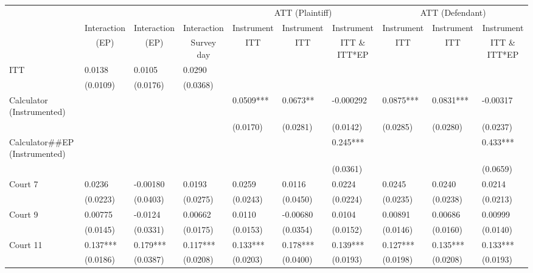 \begin{tabular}{llllllllll}
      & \multicolumn{3}{c}{}  & \multicolumn{3}{c}{ATT (Plaintiff)} & \multicolumn{3}{c}{ATT (Defendant)} \\
\cmidrule{2-10}      & \multicolumn{1}{c}{Interaction} & \multicolumn{1}{c}{Interaction} & \multicolumn{1}{c}{Interaction} & \multicolumn{1}{c}{Instrument} & \multicolumn{1}{c}{Instrument} & \multicolumn{1}{c}{Instrument} & \multicolumn{1}{c}{Instrument} & \multicolumn{1}{c}{Instrument} & \multicolumn{1}{c}{Instrument} \\
\cmidrule{2-10}      & \multicolumn{1}{c}{ (EP)} & \multicolumn{1}{c}{(EP)} & \multicolumn{1}{c}{Survey day} & \multicolumn{1}{c}{ITT} & \multicolumn{1}{c}{ITT} & \multicolumn{1}{c}{ITT \& ITT*EP} & \multicolumn{1}{c}{ITT} & \multicolumn{1}{c}{ITT} & \multicolumn{1}{c}{ITT \& ITT*EP} \\
\midrule
\midrule
ITT   & 0.0138 & 0.0105 & 0.0290 &       &       &       &       &       &  \\
      & (0.0109) & (0.0176) & (0.0368) &       &       &       &       &       &  \\
Calculator (Instrumented) &       &       &       & 0.0509*** & 0.0673** & -0.000292 & 0.0875*** & 0.0831*** & -0.00317 \\
      &       &       &       & (0.0170) & (0.0281) & (0.0142) & (0.0285) & (0.0280) & (0.0237) \\
Calculator\#\#EP (Instrumented) &       &       &       &       &       & 0.245*** &       &       & 0.433*** \\
      &       &       &       &       &       & (0.0361) &       &       & (0.0659) \\
Court 7 & 0.0236 & -0.00180 & 0.0193 & 0.0259 & 0.0116 & 0.0224 & 0.0245 & 0.0240 & 0.0214 \\
      & (0.0223) & (0.0403) & (0.0275) & (0.0243) & (0.0450) & (0.0224) & (0.0235) & (0.0238) & (0.0213) \\
Court 9 & 0.00775 & -0.0124 & 0.00662 & 0.0110 & -0.00680 & 0.0104 & 0.00891 & 0.00686 & 0.00999 \\
      & (0.0145) & (0.0331) & (0.0175) & (0.0153) & (0.0354) & (0.0152) & (0.0146) & (0.0160) & (0.0140) \\
Court 11 & 0.137*** & 0.179*** & 0.117*** & 0.133*** & 0.178*** & 0.139*** & 0.127*** & 0.135*** & 0.133*** \\
      & (0.0186) & (0.0387) & (0.0208) & (0.0203) & (0.0400) & (0.0193) & (0.0198) & (0.0208) & (0.0193) \\

\end{tabular}
